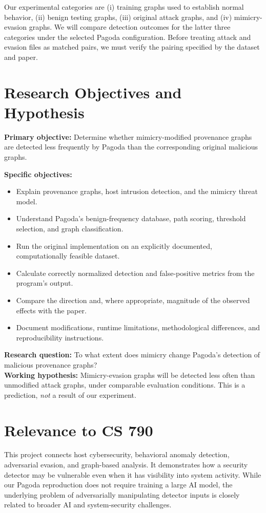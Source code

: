 \documentclass[11pt,letterpaper]{article}
\begin{document}
Our experimental categories are (i) training graphs used to establish normal behavior, (ii) benign testing graphs, (iii) original attack graphs, and (iv) mimicry-evasion graphs. We will compare detection outcomes for the latter three categories under the selected Pagoda configuration. Before treating attack and evasion files as matched pairs, we must verify the pairing specified by the dataset and paper.

\section{Research Objectives and Hypothesis}
\textbf{Primary objective:} Determine whether mimicry-modified provenance graphs are detected less frequently by Pagoda than the corresponding original malicious graphs.

\textbf{Specific objectives:}
\begin{itemize}
\item Explain provenance graphs, host intrusion detection, and the mimicry threat model.
\item Understand Pagoda's benign-frequency database, path scoring, threshold selection, and graph classification.
\item Run the original implementation on an explicitly documented, computationally feasible dataset.
\item Calculate correctly normalized detection and false-positive metrics from the program's output.
\item Compare the direction and, where appropriate, magnitude of the observed effects with the paper.
\item Document modifications, runtime limitations, methodological differences, and reproducibility instructions.
\end{itemize}
\textbf{Research question:} To what extent does mimicry change Pagoda's detection of malicious provenance graphs?\\
\textbf{Working hypothesis:} Mimicry-evasion graphs will be detected less often than unmodified attack graphs, under comparable evaluation conditions. This is a prediction, \emph{not} a result of our experiment.

\section{Relevance to CS 790}
This project connects host cybersecurity, behavioral anomaly detection, adversarial evasion, and graph-based analysis. It demonstrates how a security detector may be vulnerable even when it has visibility into system activity. While our Pagoda reproduction does not require training a large AI model, the underlying problem of adversarially manipulating detector inputs is closely related to broader AI and system-security challenges.
\end{document}
